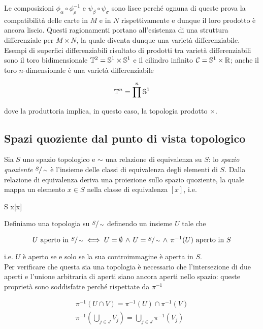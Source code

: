 Le composizioni $ \phi_{\alpha} \circ \phi_{\rho}^{-1} $ e $ \psi_{\beta} \circ \psi_{\sigma} $ sono lisce perché ognuna di queste prova la compatibilità delle carte in $ M $ e in $ N $ rispettivamente e dunque il loro prodotto è ancora liscio. Questi ragionamenti portano all'esistenza di una struttura differenziale per $ M \times N $, la quale diventa dunque una varietà differenziabile.\\
Esempi di superfici differenziabili risultato di prodotti tra varietà differenziabili sono il toro bidimensionale $ \mathbb{T}^{2} = \mathbb{S}^{1} \times \mathbb{S}^{1} $ e il cilindro infinito $ \mathcal{C} = \mathbb{S}^{1} \times \mathbb{R} $; anche il toro $ n $-dimensionale è una varietà differenziabile

\begin{align}
	\mathbb{T}^{n} = \prod^{n} \mathbb{S}^{1}
\end{align}

dove la produttoria implica, in questo caso, la topologia prodotto $ \times $.

\subsection{Spazi quoziente dal punto di vista topologico}

Sia $ S $ uno spazio topologico e $ \sim $ una relazione di equivalenza su $ S $: lo \textit{spazio quoziente} $ \sfrac{S}{\sim} $ è l'insieme delle classi di equivalenza degli elementi di $ S $. Dalla relazione di equivalenza deriva una proiezione sullo spazio quoziente, la quale mappa un elemento $ x \in S $ nella classe di equivalenza $ [x] $, i.e.

\map{\pi}
	{S}{}
	{x}{[x]}
	
Definiamo una topologia su $ \sfrac{S}{\sim} $ definendo un insieme $ U $ tale che

\begin{equation}
	U \text{ aperto in } \sfrac{S}{\sim} \iff U = \emptyset \, \wedge \, U = \sfrac{S}{\sim} \, \wedge \, \pi^{-1}(U) \text{ aperto in } S
\end{equation}

i.e. $ U $ è aperto se e solo se la sua controimmagine è aperta in $ S $.\\
Per verificare che questa sia una topologia è necessario che l'intersezione di due aperti e l'unione arbitraria di aperti siano ancora aperti nello spazio: queste proprietà sono soddisfatte perché rispettate da $ \pi^{-1} $

\begin{gather}
	\pi^{-1}(U \cap V) = \pi^{-1}(U) \cap \pi^{-1}(V)\\
	\pi^{-1}\left( \bigcup_{j \in J} V_{j} \right) = \bigcup_{j \in J} \pi^{-1}(V_{j})
\end{gather}

